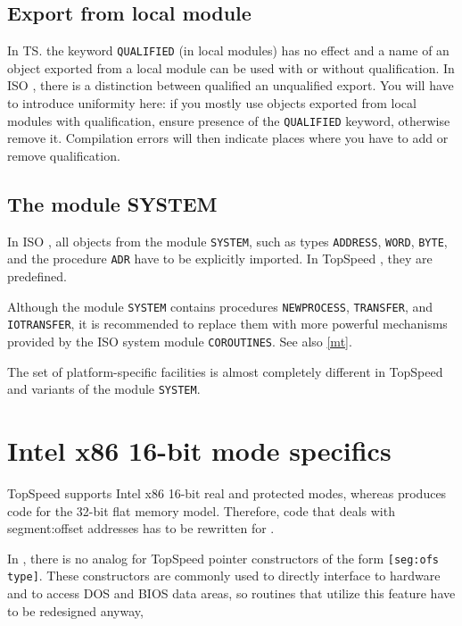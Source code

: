 \subsection{Export from local module}

    In TS. the keyword \verb'QUALIFIED' (in local modules) has no effect and
    a name of an object exported from a local module can be used with or
    without qualification. In ISO \mt{}, there is a distinction between
    qualified an unqualified export. You will have to introduce uniformity
    here: if you mostly use objects exported from local modules with 
    qualification, ensure presence of the \verb'QUALIFIED' keyword, otherwise
    remove it. Compilation errors will then indicate places where you have to
    add or remove qualification.

\subsection{The module SYSTEM}

    In ISO \mt{}, all objects from the module \verb'SYSTEM', such as types
    \verb'ADDRESS', \verb'WORD', \verb'BYTE', and the procedure \verb'ADR'
    have to be explicitly imported. In TopSpeed \mt{}, they are predefined.

    Although the \xds{} module \verb'SYSTEM' contains procedures 
    \verb'NEWPROCESS', \verb'TRANSFER', and \verb'IOTRANSFER', 
    it is recommended to replace them with more powerful mechanisms provided 
    by the ISO system module \verb'COROUTINES'. See also \ref{mt}.

    The set of platform-specific facilities is almost completely different
    in TopSpeed and \xds{} variants of the module \verb'SYSTEM'.

\section{Intel x86 16-bit mode specifics}

    TopSpeed \mt{} supports Intel x86 16-bit real and protected modes,
    whereas \XDS{} produces code for the 32-bit flat memory model. 
    Therefore, code that deals with segment:offset addresses has to be
    rewritten for \XDS{}.

    In \XDS{}, there is no analog for TopSpeed pointer constructors of 
    the form \verb'[seg:ofs type]'. These constructors are commonly used 
    to directly interface to hardware and to access DOS and BIOS data areas,
    so routines that utilize this feature have to be redesigned anyway,


